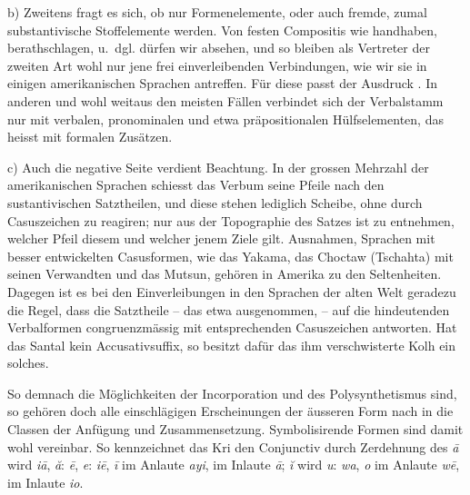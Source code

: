 b) Zweitens fragt es sich, ob nur Formenelemente, oder auch fremde, zumal substantivische Stoffelemente  werden. Von festen Compositis wie handhaben, berathschlagen,  u.~dgl. dürfen wir absehen, und so bleiben als Vertreter der zweiten Art wohl nur jene frei einverleiben\label{fp.209}den Verbindungen, wie wir sie in einigen amerikanischen Sprachen antreffen. Für diese passt der Ausdruck . In anderen und wohl weitaus den meisten Fällen verbindet sich der Verbalstamm nur mit verbalen, pronominalen und etwa präpositionalen Hülfselementen, das heisst mit formalen Zusätzen.

c) Auch die negative Seite verdient Beachtung. In der grossen Mehrzahl der amerikanischen Sprachen schiesst das Verbum seine Pfeile nach den sustantivischen Satztheilen, und diese stehen lediglich Scheibe, ohne durch Casuszeichen zu reagiren; nur aus der Topographie des Satzes ist zu entnehmen, welcher Pfeil diesem und welcher jenem Ziele gilt. Ausnahmen, Sprachen mit besser entwickelten Casusformen, wie das Yakama, das Choctaw (Tschahta) mit seinen Verwandten und das Mutsun, gehören in Amerika zu den Seltenheiten. Dagegen ist es bei den Ein\label{fp.341}verleibungen in den Sprachen der alten Welt geradezu die Regel, dass die  Satztheile – das  etwa ausgenommen, – auf die hindeutenden Verbalformen congruenzmässig mit entsprechenden Casuszeichen antworten. Hat das Santal kein Accusativsuffix, so besitzt dafür das ihm verschwisterte Kolh ein solches.

\label{sp.359}

So  demnach die Möglichkeiten der Incorporation und des Polysynthetismus sind, so gehören doch alle einschlägigen Erscheinungen der äusseren Form nach in die Classen der Anfügung und Zusammensetzung. Symbolisirende Formen sind damit wohl vereinbar. So kennzeichnet das Kri den Conjunctiv durch Zerdehnung des  \textit{ā} wird \textit{iā}, \textit{ă}: \textit{ē}, \textit{e}: \textit{iē}, \textit{ī} im Anlaute \textit{ayi}, im Inlaute \textit{ā}; \textit{ĭ} wird  \textit{u}: \textit{wa}, \textit{o} im Anlaute \textit{wē}, im Inlaute \textit{io}.


